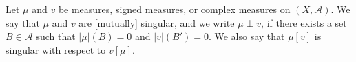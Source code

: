Let $\mu$ and $v$ be measures, signed measures, or complex measures on $(X, \mathcal{A})$. We say that $\mu$ and $v$ are [mutually] singular, and we write $\mu \perp v$, if there exists a set $B \in \mathcal{A}$ such that $|\mu|(B) = 0$ and $|v|(B') = 0$. We also say that $\mu[v]$ is singular with respect to $v[\mu]$.